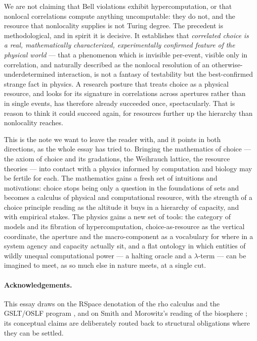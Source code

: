 We are not claiming that Bell violations exhibit hypercomputation, or that nonlocal correlations
compute anything uncomputable: they do not, and the resource that nonlocality supplies is not
Turing degree. The precedent is methodological, and in spirit it is decisive. It establishes
that \emph{correlated choice is a real, mathematically characterized, experimentally confirmed
feature of the physical world} --- that a phenomenon which is invisible per-event, visible only
in correlation, and naturally described as the nonlocal resolution of an otherwise-underdetermined
interaction, is not a fantasy of testability but the best-confirmed strange fact in physics.
A research posture that treats choice as a physical resource, and looks for its signature in
correlations across apertures rather than in single events, has therefore already succeeded once,
spectacularly. That is reason to think it could succeed again, for resources further up the
hierarchy than nonlocality reaches.

This is the note we want to leave the reader with, and it points in both directions, as the whole
essay has tried to. Bringing the mathematics of choice --- the axiom of choice and its gradations,
the Weihrauch lattice, the resource theories --- into contact with a physics informed by computation
and biology may be fertile for each. The mathematics gains a fresh set of intuitions and motivations:
choice stops being only a question in the foundations of sets and becomes a calculus of physical and
computational resource, with the strength of a choice principle reading as the altitude it buys in a
hierarchy of capacity, and with empirical stakes. The physics gains a new set of tools: the category
of models and its fibration of hypercomputation, choice-as-resource as the vertical coordinate, the
aperture and the macro-component as a vocabulary for where in a system agency and capacity actually
sit, and a flat ontology in which entities of wildly unequal computational power --- a halting oracle
and a $\lambda$-term --- can be imagined to meet, as so much else in nature meets, at a single cut.

\paragraph{Acknowledgements.}
This essay draws on the RSpace denotation of the rho calculus \cite{qcs,paths} and the GSLT/OSLF
program \cite{OSLF}, and on Smith and Morowitz's reading of the biosphere \cite{SmithMorowitz}; its
conceptual claims are deliberately routed back to structural obligations where they can be settled.
